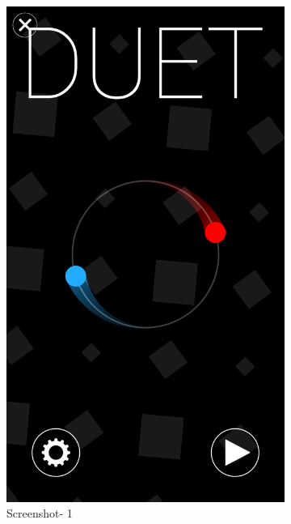\begin{figure}[h]
	\centering
	\begin{subfigure}[h]{0.45\textwidth}
		\centering
		\includegraphics[width=\textwidth]{duet1.png}
		\caption{Screenshot- 1}
	\end{subfigure}
	\hfill
	\begin{subfigure}[h]{0.45\textwidth}
		\centering

\end{subfigure}
\end{figure}
